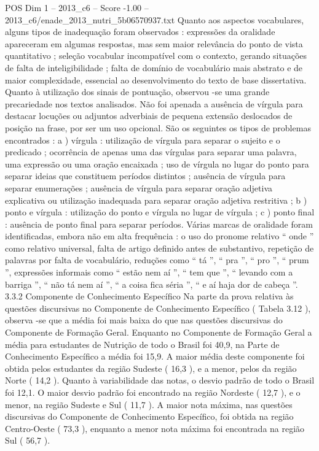 \begin{textsample}{POS Dim 1 – 2013\_c6 – Score -1.00 – 2013\_c6/enade\_2013\_nutri\_5b06570937.txt}
Quanto aos aspectos vocabulares, alguns tipos de inadequação foram observados : expressões da oralidade apareceram em algumas respostas, mas sem maior relevância do ponto de vista quantitativo ; seleção vocabular incompatível com o contexto, gerando situações de falta de inteligibilidade ; falta de domínio de vocabulário mais abstrato e de maior complexidade, essencial ao desenvolvimento do texto de base dissertativa.
Quanto à utilização dos sinais de pontuação, observou -se uma grande precariedade nos textos analisados.
Não foi apenada a ausência de vírgula para destacar locuções ou adjuntos adverbiais de pequena extensão deslocados de posição na frase, por ser um uso opcional.
São os seguintes os tipos de problemas encontrados : a ) vírgula : utilização de vírgula para separar o sujeito e o predicado ; ocorrência de apenas uma das vírgulas para separar uma palavra, uma expressão ou uma oração encaixada ; uso de vírgula no lugar do ponto para separar ideias que constituem períodos distintos ; ausência de vírgula para separar enumerações ; ausência de vírgula para separar oração adjetiva explicativa ou utilização inadequada para separar oração adjetiva restritiva ; b ) ponto e vírgula : utilização do ponto e vírgula no lugar de vírgula ; c ) ponto final : ausência de ponto final para separar períodos.
Várias marcas de oralidade foram identificadas, embora não em alta frequência : o uso do pronome relativo “ onde ” como relativo universal, falta de artigo definido antes de substantivo, repetição de palavras por falta de vocabulário, reduções como “ tá ”, “ pra ”, “ pro ”, “ prum ”, expressões informais como “ estão nem aí ”, “ tem que ”, “ levando com a barriga ”, “ não tá nem aí ”, “ a coisa fica séria ”, “ e aí haja dor de cabeça ”. 3.3.2 Componente de Conhecimento Específico Na parte da prova relativa às questões discursivas no Componente de Conhecimento Específico ( Tabela 3.12 ), observa -se que a média foi mais baixa do que nas questões discursivas do Componente de Formação Geral.
Enquanto no Componente de Formação Geral a média para estudantes de Nutrição de todo o Brasil foi 40,9, na Parte de Conhecimento Específico a média foi 15,9.
A maior média deste componente foi obtida pelos estudantes da região Sudeste ( 16,3 ), e a menor, pelos da região Norte ( 14,2 ).
Quanto à variabilidade das notas, o desvio padrão de todo o Brasil foi 12,1.
O maior desvio padrão foi encontrado na região Nordeste ( 12,7 ), e o menor, na região Sudeste e Sul ( 11,7 ).
A maior nota máxima, nas questões discursivas do Componente de Conhecimento Específico, foi obtida na região Centro-Oeste ( 73,3 ), enquanto a menor nota máxima foi encontrada na região Sul ( 56,7 ).

\end{textsample}
